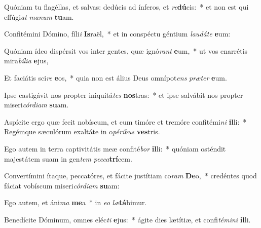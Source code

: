 \item Quóniam tu flagéllas, et salvas: dedúcis ad ínferos, et \textit{re}\textbf{dú}cis:~* et non est qui effúgi\textit{at} \textit{ma}\textit{num} \textbf{tu}am.
\item Confitémini Dómino, fíli\textit{i} \textbf{Is}raël,~* et in conspéctu géntium \textit{lau}\textit{dá}\textit{te} \textbf{e}um:
\item Quóniam ídeo dispérsit vos inter gentes, quæ ignó\textit{rant} \textbf{e}um,~* ut vos enarrétis mira\textit{bí}\textit{li}\textit{a} \textbf{e}jus,
\item Et faciátis sci\textit{re} \textbf{e}os,~* quia non est álius Deus omnípot\textit{ens} \textit{præ}\textit{ter} \textbf{e}um.
\item Ipse castigávit nos propter iniquitá\textit{tes} \textbf{nos}tras:~* et ipse salvábit nos propter miseri\textit{cór}\textit{di}\textit{am} \textbf{su}am.
\item Aspícite ergo quæ fecit nobíscum, et cum timóre et tremóre confitémi\textit{ni} \textbf{il}li:~* Regémque sæculórum exaltáte in o\textit{pé}\textit{ri}\textit{bus} \textbf{ves}tris.
\item Ego autem in terra captivitátis meæ confité\textit{bor} \textbf{il}li:~* quóniam osténdit majestátem suam in gen\textit{tem} \textit{pec}\textit{ca}\textbf{trí}cem.
\item Convertímini ítaque, peccatóres, et fácite justítiam co\textit{ram} \textbf{De}o,~* credéntes quod fáciat vobíscum miseri\textit{cór}\textit{di}\textit{am} \textbf{su}am:
\item Ego autem, et áni\textit{ma} \textbf{me}a~* in \textit{e}\textit{o} \textit{læ}\textbf{tá}bimur.
\item Benedícite Dóminum, omnes eléc\textit{ti} \textbf{e}jus:~* ágite dies lætítiæ, et confi\textit{té}\textit{mi}\textit{ni} \textbf{il}li.

